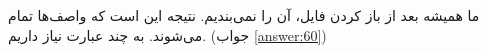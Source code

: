 \section{}
\paragraph{}\label{hint:185}
ما همیشه بعد از باز کردن فایل، آن را نمی‌بندیم. نتیجه این است که واصف‌ها تمام می‌شوند. به چند عبارت  نیاز داریم. (جواب \ref{answer:60})